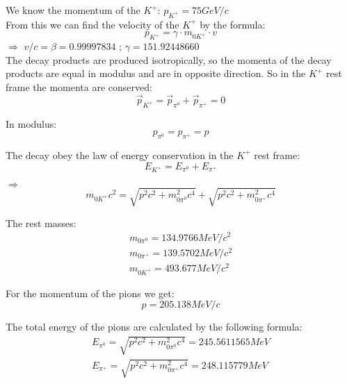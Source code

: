 \documentclass[11pt]{report}
\begin{document}
We know the momentum of the $K^+$: $p_{K^+} = 75 GeV/c$\\
From this we can find the velocity of the $K^+$ by the formula:
\begin{equation}
p_{K^+} = \gamma \cdot m_{0K^+} \cdot v
\end{equation}
$\Rightarrow$
$v/c = \beta = 0.99997834$ ;
$\gamma = 151.92448660$\\



The decay products are produced isotropically, so the momenta of the decay products are equal in modulus and are in opposite direction. 
So in the $K^+$ rest frame the momenta are conserved:
\begin{equation}
\overrightarrow{p}_{K^+} = \overrightarrow{p}_{\pi^0} + \overrightarrow{p}_{\pi^+} = 0
\end{equation}

In modulus:
\begin{equation}
p_{\pi^0} = p_{\pi^+} = p
\end{equation}

The decay obey the law of energy conservation in the $K^+$ rest frame:
\begin{equation}
E_{K^+} = E_{\pi^0} + E_{\pi^+}
\end{equation}

$\Rightarrow$
\begin{equation}
m_{0K^+}c^2 = \sqrt{p^2c^2 + m_{0\pi^0}^2c^4} + \sqrt{p^2c^2 + m_{0\pi^+}^2c^4}
\end{equation}

The rest masses:
\begin{eqnarray}
m_{0\pi^0} = 134.9766 MeV/c^2\\
m_{0\pi^+} = 139.5702 MeV/c^2\\
m_{0K^+} = 493.677 MeV/c^2
\end{eqnarray}

For the momentum of the pions we get:\\

\begin{equation}
p = 205.138 MeV/c
\end{equation}

The total energy of the pions are calculated by the following formula:
\begin{eqnarray}
E_{\pi^0} = \sqrt{p^2c^2 + m_{0\pi^0}^2c^4} = 245.5611565 MeV\\
E_{\pi^+} = \sqrt{p^2c^2 + m_{0\pi^+}^2c^4}= 248.115779 MeV
\end{eqnarray}
\end{document}
